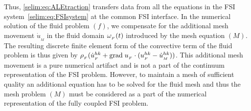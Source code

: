 Thus, \eqref{selim:eq:ALEtraction} transfers data from all the
equations in the FSI system~\eqref{selim:eq:FSIsystem} at the common
FSI interface. In the numerical solution of the fluid problem $(f)$,
we compensate for the additional mesh movement $\dot{u}_{_{M}}$ in the
fluid domain $\omega_{_{F}}(t)$ introduced by the mesh equation $(M)$.  The
resulting discrete finite element form of the convective term of the
fluid problem is thus given by $\rho_{_{F}}(\dot{u}_{_{F}}^{hk} +
\textrm{grad}\;u_{_{F}}\cdot(u_{_{F}}^{hk} - \dot{u}_{_{M}}^{hk}))$.  This additional mesh
movement is a pure numerical artifact and is not a part of the
continuum representation of the FSI problem. However, to maintain a
mesh of sufficient quality an additional equation has to be solved for
the fluid mesh and thus the mesh problem $(M)$ must be considered as a
part of the numerical representation of the fully coupled FSI problem.

